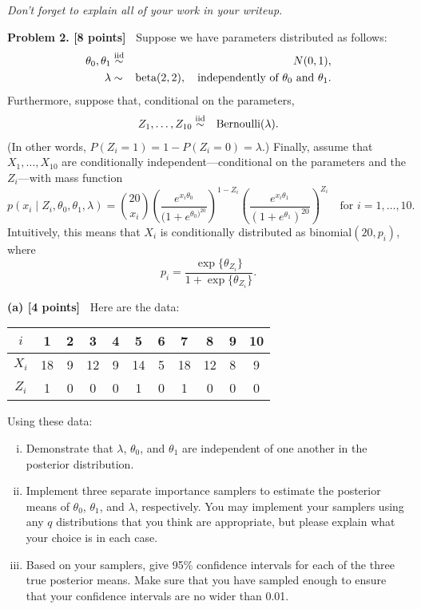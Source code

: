 \documentclass{article}
\newcommand{\svskip}{\vspace{.2in}}
\newcommand{\mvskip}{\vspace{.25in}}
\begin{document}
\svskip
{\em Don't forget to explain all of your work in your writeup.}

\mvskip
{\bf Problem 2. [8 points]\ }
Suppose we have parameters distributed as follows:
\begin{eqnarray*}
\theta_0, \theta_1 & \stackrel{\rm iid}{\sim} & N(0,1),\\
\lambda  &\sim& \mbox{beta}(2,2), 
\quad\mbox{independently of $\theta_0$ and $\theta_1$.}\\ 
\end{eqnarray*}
Furthermore, suppose that, conditional on the parameters,
\begin{eqnarray*}
Z_1, \ldots, Z_{10} & \stackrel{\rm iid}{\sim} & \mbox{Bernoulli}(\lambda). \\
\end{eqnarray*}
(In other words, $P(Z_i=1) = 1-P(Z_i=0) = \lambda$.)
Finally, assume that $X_1, \ldots, X_{10}$ are conditionally independent---conditional 
on the parameters and the $Z_i$---with mass function
\[
p(x_i \mid Z_i, \theta_0, \theta_1, \lambda) =
{{20} \choose x_i }
\left( \frac{e^{x_i \theta_0}}{(1 + e^{\theta_0)^{20}}} \right)^{1-Z_i}
\left( \frac{e^{x_i \theta_1}}{(1 + e^{\theta_1})^{20}} \right)^{Z_i}
\quad\mbox{for $i=1, \ldots, 10$.}
\]
Intuitively, this means that
$X_i$ is conditionally distributed as 
binomial$(20, p_i)$, where 
\[
p_i = \frac{\exp\{\theta_{Z_i}\}}{1+\exp\{\theta_{Z_i}\}}.
\]

\svskip
{\bf (a) [4 points]\ }
Here are the data:

\svskip
\begin{tabular}{c|cccccccccc}
$i$ & 1 & 2 & 3 & 4 & 5 & 6 & 7 & 8 & 9 & 10 \\ \hline
$X_i$ & 18 & 9 & 12 & 9 & 14 & 5 & 18 & 12 & 8 & 9 \\ \hline
$Z_i$ & 1 & 0 & 0 & 0 & 1 & 0 & 1 & 0 & 0 & 0 
\end{tabular}

\svskip
Using these data:

\begin{enumerate}[(i)]
\item Demonstrate that $\lambda$,
$\theta_0$, and $\theta_1$ are independent of one another
in the posterior distribution.
\item Implement three separate importance samplers 
to estimate the posterior means
of $\theta_0$, $\theta_1$, and $\lambda$, respectively.  You may 
implement your samplers using any $q$ distributions that you think
are appropriate, but please explain what your choice is in each case.
\item 
Based on your samplers,
give 95\% confidence intervals for each of the three true posterior
means.  Make sure that you have sampled enough to ensure that
your confidence intervals are no wider than 0.01.
\end{enumerate}
\end{document}
